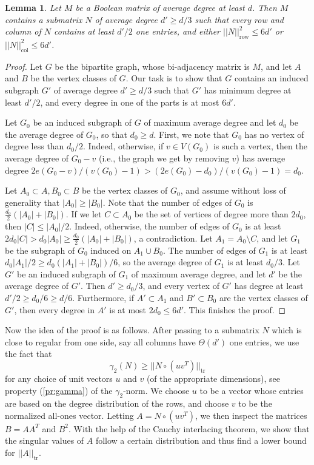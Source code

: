 \documentclass[11pt]{amsart}
\theoremstyle{plain}
\newtheorem{lemma}[theorem]{Lemma}
\theoremstyle{definition}
\DeclareMathOperator{\tr}{tr}
\DeclareMathOperator{\row}{row}
\DeclareMathOperator{\col}{col}
\begin{document}
\begin{lemma}\label{lemma:regularize}
Let $M$ be a Boolean matrix of average degree at least $d$. Then $M$ contains a submatrix $N$ of average degree $d'\geq d/3$ such that every row and column of $N$ contains at least $d'/2$ one entries, and either $||N||_{\row}^2\leq 6d'$ or $||N||_{\col}^2\leq 6d'$.
\end{lemma}

\begin{proof}
Let $G$ be the bipartite graph, whose bi-adjacency matrix is $M$, and let $A$ and $B$ be the vertex classes of $G$. Our task is to show that $G$ contains an induced subgraph $G'$ of average degree  $d'\geq d/3$ such that $G'$ has minimum degree at least $d'/2$, and every degree in one of the parts is at most $6d'$. 

Let $G_0$ be an induced subgraph of $G$ of maximum average degree and let $d_0$ be the average degree of $G_0$, so that $d_0\geq d$. First, we note that $G_0$ has no vertex of degree less than $d_0/2$. Indeed, otherwise, if $v\in V(G_0)$ is such a vertex, then the average degree of $G_0-v$ (i.e., the graph we get by removing $v$) has average degree $2e(G_0-v)/(v(G_0)-1)>(2e(G_0)-d_0)/(v(G_0)-1)=d_0$.

Let $A_0\subset A,B_0\subset B$ be the vertex classes of $G_0$, and assume without loss of generality that $|A_0|\geq |B_0|$. Note that the number of edges of $G_0$ is $\frac{d_0}{2}(|A_0|+|B_0|)$. If we let $C\subset A_0$ be the set of vertices of degree more than $2d_0$, then $|C|\leq |A_0|/2$. Indeed, otherwise, the number of edges of $G_0$ is at least $2d_0|C|>d_0|A_0|\geq\frac{d_0}{2}(|A_0|+|B_0|)$, a contradiction. Let $A_1=A_0\setminus C$, and let $G_1$ be the subgraph of $G_0$ induced on $A_1\cup B_0$. The number of edges of $G_1$ is at least $d_0|A_1|/2\geq d_0 (|A_1|+|B_0|)/6$, so the average degree of $G_1$ is at least $d_0/3$. Let $G'$ be an induced subgraph of $G_1$ of maximum average degree, and let $d'$ be the average degree of $G'$. Then $d'\geq d_0/3$, and every vertex of $G'$ has degree at least $d'/2\geq d_0/6\geq d/6$. Furthermore, if $A'\subset A_1$ and $B'\subset B_0$ are the vertex classes of $G'$, then every degree in $A'$ is at most $2d_0\leq 6d'$. This finishes the proof.
\end{proof}

Now the idea of the proof is as follows. After passing to a submatrix $N$ which is close to regular from one side, say all columns have $\Theta(d')$ one entries, we use the fact that $$\gamma_2(N)\geq||N\circ (u v^T)||_{\tr}$$
for any choice of unit vectors $u$ and $v$ (of the appropriate dimensions), see property (\ref{pr:gamma}) of the $\gamma_2$-norm. We choose $u$ to be a vector whose entries are based on the degree distribution of the rows, and choose $v$ to be the normalized all-ones vector. Letting $A=N\circ (u v^T)$, we then inspect the matrices $B=AA^T$ and $B^2$. With the help of the Cauchy interlacing theorem, we show that the singular values of $A$ follow a certain distribution and thus find a lower bound for $||A||_{\tr}$.
\end{document}
